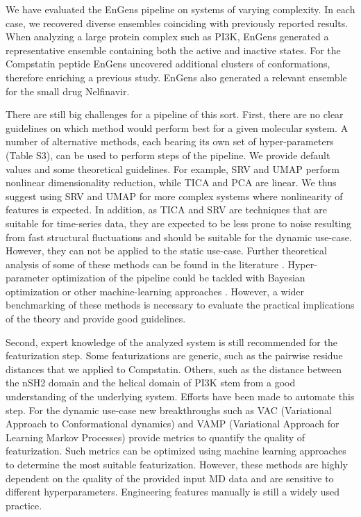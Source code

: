 \documentclass[unnumsec,webpdf,contemporary,large,numsquare]{oup-authoring-template}%
\theoremstyle{thmstyleone}%
\theoremstyle{thmstyletwo}%
\theoremstyle{thmstylethree}%
\begin{document}
We have evaluated the EnGens pipeline on systems of varying complexity. In each case, we recovered diverse ensembles coinciding with previously reported results. When analyzing a large protein complex such as PI3K, EnGens generated a representative ensemble containing both the active and inactive states.  For the Compstatin peptide EnGens uncovered additional clusters of conformations, therefore enriching a previous study. EnGens also generated a relevant ensemble for the small drug Nelfinavir. 

There are still big challenges for a pipeline of this sort. First, there are no clear guidelines on which method would perform best for a given molecular system. A number of alternative methods, each bearing its own set of hyper-parameters (Table S3), can be used to perform steps of the pipeline. We provide default values and some theoretical guidelines. For example, SRV and  UMAP perform nonlinear dimensionality reduction, while TICA and PCA are linear. We thus suggest using SRV and UMAP for more complex systems where nonlinearity of features is expected. In addition, as TICA and SRV are techniques that are suitable for time-series data, they are expected to be less prone to noise resulting from fast structural fluctuations and should be suitable for the dynamic use-case. However, they can not be applied to the static use-case. Further theoretical analysis of some of these methods can be found in the literature \citep{glielmo_unsupervised_2021}. Hyper-parameter optimization of the pipeline could be tackled with Bayesian optimization or other machine-learning approaches \citep{lee_adaptive_2022}. However, a wider benchmarking of these  methods is necessary to evaluate the practical implications of the theory and provide good guidelines.

Second, expert knowledge of the analyzed system is still recommended for the featurization step. Some featurizations are generic, such as the pairwise residue distances that we applied to Compstatin. Others, such as the distance between the nSH2 domain and the helical domain of PI3K stem from a good understanding of the underlying system. Efforts have been made to automate this step. For the dynamic use-case new breakthroughs such as VAC (Variational Approach to Conformational dynamics) \citep{wu_variational_2020, lorpaiboon_integrated_2020} and VAMP (Variational Approach for Learning Markov Processes) \citep{wu_variational_2020} provide metrics to quantify the quality of featurization. Such metrics can be optimized using machine learning approaches to determine the most suitable featurization. However, these methods are highly dependent on the quality of the provided input MD data and are sensitive to different hyperparameters. Engineering features manually is still a widely used practice. 
\end{document}
